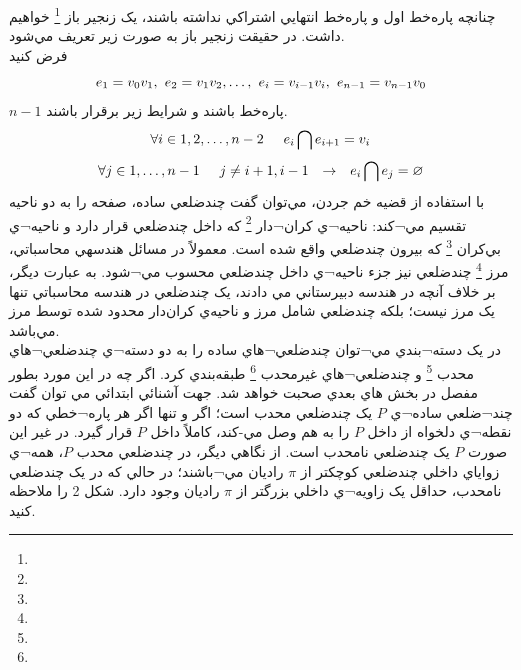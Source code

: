 \documentclass{book}
\begin{document}
       چنانچه پاره‌خط اول و پاره‌خط انتهايي اشتراکي نداشته باشند، يک زنجير باز 
        	      	    \footnote{}
        	      	     خواهيم داشت. در حقيقت زنجير باز به صورت زير تعريف مي‌شود.\\
        	      	    فرض کنید 
         $$e_{1}=v_{0}v_{1},\hspace{0.125cm} e_{2}=v_{1}v_{2}, \dots , \hspace{0.125cm} e_{i}=v_{i-1}v_{i}, \hspace{0.125cm} e_{n-1}=v_{n-1}v_{0}$$
         $n-1$
         پاره‌خط باشند و شرایط زیر برقرار باشند.
         $$\forall i \in {1,2, \dots, n-2} \hspace{0.5cm} e_{i} \bigcap e_{i+1} = v_{i}$$
    	$$\forall j \in {1,\dots ,n-1} \hspace{0.5cm} j\neq i+1 , i-1 \hspace{0.25cm} \rightarrow \hspace{0.25cm}  e_{i} \bigcap e_{j} =\varnothing $$         
          با استفاده از  قضيه خم جردن، مي‌توان گفت چندضلعي ساده، صفحه را به دو ناحيه تقسيم مي¬کند: ناحيه¬ي کران¬دار
                  	      	    \footnote{}
            که داخل چندضلعي قرار دارد و ناحيه¬ي بي‌کران 
                    	      	    \footnote{}
             که بيرون چندضلعي واقع شده است. معمولاً در مسائل هندسه‍ي محاسباتي، مرز  
                     	      	    \footnote{}
             چندضلعي نيز جزء ناحيه¬ي داخل چندضلعي محسوب مي¬شود. به عبارت ديگر، بر خلاف آنچه در هندسه دبيرستاني مي دادند، يک چندضلعي در هندسه محاسباتي تنها يک مرز نيست؛ بلکه چندضلعي شامل مرز و ناحيه‌ي کران‌دار محدود شده توسط مرز مي‌باشد. \\
             
             در يک دسته¬بندي مي¬توان چندضلعي¬هاي ساده را به دو دسته¬ي چندضلعي¬هاي محدب 
                                  	      	    \footnote{}
              و چندضلعي¬هاي غيرمحدب
                                   	      	    \footnote{}
                طبقه‌بندي کرد. اگر چه در اين مورد بطور مفصل در بخش هاي بعدي صحبت خواهد شد. جهت آشنائي ابتدائي مي توان گفت  چند¬ضلعي ساده¬ي $P$ يک چندضلعي محدب است؛ اگر و تنها اگر هر پاره¬خطي که دو نقطه¬ي دلخواه از داخل $P$ را به هم وصل مي-کند، کاملاً داخل $P$ قرار گيرد. در غير اين صورت $P$ يک چندضلعي نامحدب است. از نگاهي ديگر، در چندضلعي محدب $P$، همه¬ي زواياي داخلي چندضلعي کوچکتر از $\pi$ راديان مي¬باشند؛ در حالي که در يک چندضلعي نامحدب، حداقل يک زاويه¬ي داخلي بزرگتر از $\pi$ راديان وجود دارد. شکل 2 را ملاحظه کنيد.\\
\end{document}
